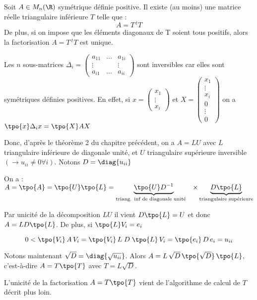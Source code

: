 \begin{ftheo}
    Soit $A \in M_n(\R)$ symétrique définie positive. Il existe (au moins) une matrice réelle triangulaire inférieure $T$ telle que :
    \[
        A = T \,^tT
    \]
    De plus, si on impose que les éléments diagonaux de T soient tous positifs, alors la factorisation $A = T \,^tT$ est unique.
\end{ftheo}


\begin{preuve}
    Les $n$ sous-matrices 
$\Delta _i =
\begin{pmatrix}
    a_{11} & \dots & a_{1i} \\
    \vdots & & \vdots \\
    a_{i1} & \dots & a_{ii}
\end{pmatrix}$
sont inversibles car elles sont symétriques définies positives. En effet, si 
$x =
\begin{pmatrix}
    x_1 \\
    \vdots \\
    x_i
\end{pmatrix}
$
et
$X =
\begin{pmatrix}
    x_1 \\
    \vdots \\
    x_i \\
    0 \\
    \vdots \\
    0
\end{pmatrix}
$
on a $\tpo{x} \Delta_i x = \tpo{X}AX$

Donc, d'après le théorème 2 du chapitre précédent, on a $A = LU$ avec $L$ triangulaire
inférieure de diagonale unité, et $U$ triangulaire supérieure inversible $(\rightarrow u_{ii} \ne 0 \forall i)$.
Notons $D = \diag{u_{ii}}$

On a : $A = \tpo{A} = \tpo{U} \tpo{L} = \underbrace{\tpo{U} D^{-1}}_\text{triang. inf de diagonale unité \hspace{0.2cm}}
\times
\underbrace{D \tpo{L}}_\text{triangulaire supérieure}$

Par unicité de la décomposition $LU$ il vient $D\tpo{L} = U$ et donc $A = L D \tpo{L}$. De plus, si $\tpo{L} V_i = e_i$

\[
    0 < \tpo{V_i} \, A \, V_i = \tpo{V_i} \, L \; D \; \tpo{L} \, V_i = \tpo{e_i} \, D \, e_i = u_{ii}
\]

Notons maintenant $\sqrt{D} = \diag{\sqrt{u_{ii}}}$. Alors $A = L \, \sqrt{D} \, \tpo{\sqrt{D}} \, \tpo{L}$,
c'est-à-dire $A = T \tpo{T}$ avec $T = L \sqrt{D}$.

L'unicité de la factorisation $A = T \tpo{T}$ vient de l'algorithme de calcul de $T$ décrit plus loin.
\end{preuve}


